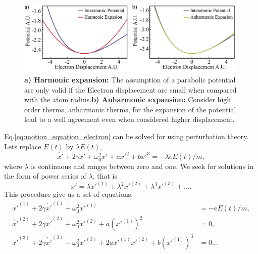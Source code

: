 \begin{figure}[h!]
    \centering
    \includegraphics[width = 16cm]{figuras/Dissertation_interatomic_expassion.jpg}
    \caption{\textbf{a) Harmonic expansion:} The assumption of a parabolic potential are only valid if the Electron displacement are small when compared with the atom radius.\textbf{b) Anharmonic expansion:} Consider high order therms, anharmonic therms, for the expansion of the potential lead to a well agreement even when considered higher displacement.}
    \label{fig:expanssion}
\end{figure}
Eq.\ref{eq:motion_equation_electron} can be solved for using perturbation theory. Lets replace $E(t)$ by $\lambda E(t)$, %
\begin{equation}
    \ddot{x'} + 2\gamma\dot{x'} + \omega_0^2x'+ax'^2+bx'^3 = -\lambda eE(t)/m,
    \label{eq:pertubed_equation_electron}
\end{equation}
where $\lambda$ is continuous and ranges between zero and one. We seek for solutions in the form of power series of $\lambda$, that is 
\begin{equation}
    x' = \lambda x'^{(1)} + \lambda^2 x'^{(2)} + \lambda^3 x'^{(3)} +....
    \label{eq:x_pertubation_expanssion}
\end{equation}
This procedure give us a set of equations.
\begin{subequations}
    \begin{align}
        \ddot{x'}^{(1)} + 2\gamma\dot{x'}^{(1)} + \omega_0^2x'^{(1)} &= -eE(t)/m,\label{eq:first_order_pertubation}\\
        \ddot{x'}^{(2)} + 2\gamma\dot{x'}^{(2)} + \omega_0^2x'^{(2)}+a\left(x'^{(1)}\right)^2 &= 0,\label{eq:second_order_pertubation}\\
        \ddot{x'}^{(3)} + 2\gamma\dot{x'}^{(3)} + \omega_0^2x'^{(3)}+     2ax'^{(1)}x'^{(2)} +b\left(x'^{(1)}\right)^3 &= 0\label{eq:thirdt_order_pertubation}...    
    \end{align}
\end{subequations}

